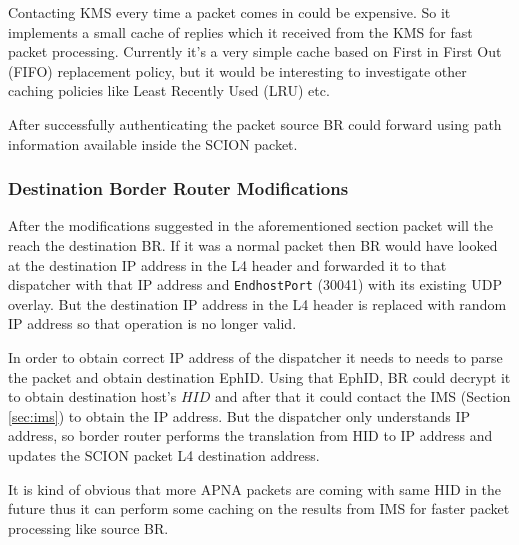 Contacting KMS every time a packet comes in could be expensive. So it implements a small cache of replies which it received from the KMS for fast packet processing. Currently it's a very simple cache based on First in First Out (FIFO) replacement policy, but it would be interesting to investigate other caching policies like Least Recently Used (LRU) etc.

After successfully authenticating the packet source BR could forward using path information available inside the SCION packet.

\subsubsection{Destination Border Router Modifications}
After the modifications suggested in the aforementioned section packet will the reach the destination BR. If it was a normal packet then BR would have looked at the destination IP address in the L4 header and forwarded it to that dispatcher with that IP address and  \texttt{EndhostPort} (30041) with its existing UDP overlay. But the destination IP address in the L4 header is replaced with random IP address so that operation is no longer valid.

In order to obtain correct IP address of the dispatcher it needs to needs to parse the packet and obtain destination EphID. Using that EphID, BR could decrypt it to obtain destination host's $HID$ and after that it could contact the IMS (Section \ref{sec:ims}) to obtain the IP address. But the dispatcher only understands IP address, so border router performs the translation from HID to IP address and updates the SCION packet L4 destination address.

It is kind of obvious that more APNA packets are coming with same HID in the future thus it can perform some caching on the results from IMS for faster packet processing like source BR.

